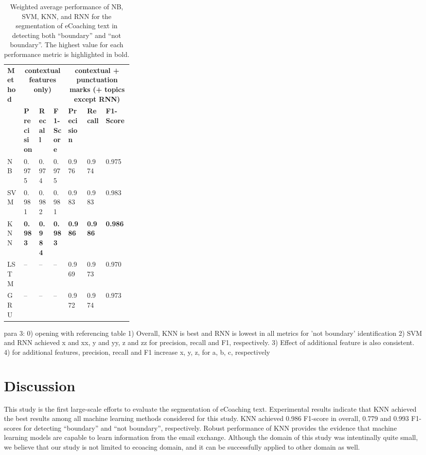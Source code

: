 \documentclass{amia}
\begin{document}
\begin{table}[ht]
\centering
\caption{Weighted average performance of NB, SVM, KNN, and RNN for the segmentation of eCoaching text in detecting both ``boundary'' and ``not boundary''. The highest value for each performance metric is highlighted in bold.}
\label{tab:result_weighted_avg}
  \begin{tabular}{|l|l|l|l|p{0.15\linewidth}|p{0.15\linewidth}|l|}
  \hline
   \multirow{2}{*}{\textbf{Method}} & \multicolumn{3}{|c|}{\textbf{contextual features only)}} & \multicolumn{3}{|c|}{\textbf{contextual + punctuation marks (+ topics except RNN)}} \\\cline{2-7}
   & \textbf{Precision}  & \textbf{Recall} & \textbf{F1-Score} & \textbf{Precision}  & \textbf{Recall} & \textbf{F1-Score}\\ \hline    
    
 NB & 0.975 & 0.974 & 0.975 & 0.976 & 0.974 & 0.975 \\ \hline
 SVM & 0.981 & 0.982 & 0.981 & 0.983 & 0.983 & 0.983\\ \hline
 KNN & \textbf{0.983} & \textbf{0.984} & \textbf{0.983} & \textbf{0.986} & \textbf{0.986} & \textbf{0.986}\\ \hline
 LSTM & -- & -- & -- & 0.969 & 0.973 & 0.970 \\ \hline
 GRU & -- & -- & -- & 0.972 & 0.974 & 0.973 \\ \hline 
  \end{tabular}
\end{table} 

para 3:
0) opening with referencing table
1) Overall, KNN is best and RNN is lowest in all metrics for 'not boundary' identification
2) SVM and RNN achieved x and xx, y and yy, z and zz for precision, recall and F1, respectively.
3) Effect of additional feature is also consistent.
4) for additional features, precision, recall and F1 increase x, y, z, for a, b, c, respectively\\

\section*{Discussion}
This study is the first large-scale efforts to evaluate the segmentation of eCoaching text. Experimental results indicate that KNN achieved the best results among all machine learning methods considered for this study. KNN achieved 0.986 F1-score in overall, 0.779 and 0.993 F1-scores for detecting ``boundary'' and ``not boundary'', respectively. Robust performance of KNN provides the evidence that machine learning models are capable to learn information from the email exchange. Although the domain of this study was intentinally quite small, we believe that our study is not limited to ecoacing domain, and it can be successfully applied to other domain as well.
\end{document}
